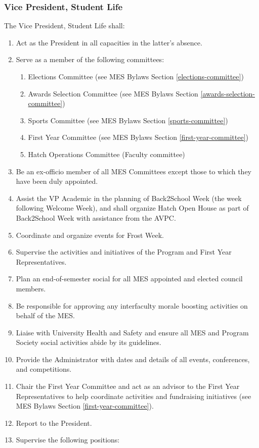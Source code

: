 \subsubsection{Vice President, Student
 Life}
\label{vice-president-student-life}
The Vice President, Student Life shall:

\begin{enumerate}
 \item
  Act as the President in all capacities in the latter's absence.
 \item
  Serve as a member of the following committees:

  \begin{enumerate}
   \item
    Elections Committee (see MES Bylaws Section \ref{elections-committee})
   \item
    Awards Selection Committee (see MES Bylaws Section \ref{awards-selection-committee})
   \item
    Sports Committee (see MES Bylaws Section \ref{sports-committee})
   \item
    First Year Committee (see MES Bylaws Section \ref{first-year-committee})
   \item
    Hatch Operations Committee (Faculty committee)
  \end{enumerate}
 \item
  Be an ex-officio member of all MES Committees except those to which they have been duly appointed.
 \item
  Assist the VP Academic in the planning of Back2School Week (the week following Welcome Week), and shall organize Hatch Open House as part of Back2School Week with assistance from the AVPC.
 \item
  Coordinate and organize events for Frost Week.
 \item
  Supervise the activities and initiatives of the Program and First Year Representatives.
 \item
  Plan an end-of-semester social for all MES appointed and elected council members.
 \item
  Be responsible for approving any interfaculty morale boosting activities on behalf of the MES.
 \item
  Liaise with University Health and Safety and ensure all MES and Program Society social activities abide by its guidelines.
 \item
  Provide the Administrator with dates and details of all events, conferences, and competitions.
 \item
  Chair the First Year Committee and act as an advisor to the First Year Representatives to help coordinate activities and fundraising initiatives (see MES Bylaws Section \ref{first-year-committee}).
 \item
  Report to the President.
 \item
  Supervise the following positions:


\end{enumerate}
